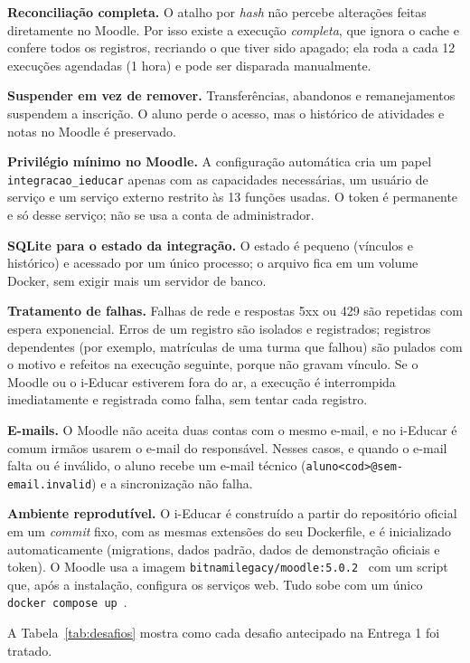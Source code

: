 \documentclass[12pt]{article}
\newcommand{\cod}[1]{\texttt{#1}}
\begin{document}
\textbf{Reconciliação completa.} O atalho por \emph{hash} não percebe
alterações feitas diretamente no Moodle. Por isso existe a execução
\emph{completa}, que ignora o cache e confere todos os registros, recriando o
que tiver sido apagado; ela roda a cada 12 execuções agendadas (1 hora) e pode
ser disparada manualmente.

\textbf{Suspender em vez de remover.} Transferências, abandonos e
remanejamentos suspendem a inscrição. O aluno perde o acesso, mas o histórico
de atividades e notas no Moodle é preservado.

\textbf{Privilégio mínimo no Moodle.} A configuração automática cria um papel
\cod{integracao\_ieducar} apenas com as capacidades necessárias, um usuário de
serviço e um serviço externo restrito às 13 funções usadas. O token é
permanente e só desse serviço; não se usa a conta de administrador.

\textbf{SQLite para o estado da integração.} O estado é pequeno (vínculos e
histórico) e acessado por um único processo; o arquivo fica em um volume
Docker, sem exigir mais um servidor de banco.

\textbf{Tratamento de falhas.} Falhas de rede e respostas 5xx ou 429 são
repetidas com espera exponencial. Erros de um registro são isolados e
registrados; registros dependentes (por exemplo, matrículas de uma turma que
falhou) são pulados com o motivo e refeitos na execução seguinte, porque não
gravam vínculo. Se o Moodle ou o i-Educar estiverem fora do ar, a execução é
interrompida imediatamente e registrada como falha, sem tentar cada registro.

\textbf{E-mails.} O Moodle não aceita duas contas com o mesmo e-mail, e no
i-Educar é comum irmãos usarem o e-mail do responsável. Nesses casos, e
quando o e-mail falta ou é inválido, o aluno recebe um e-mail técnico
(\cod{aluno<cod>@sem-email.invalid}) e a sincronização não falha.

\textbf{Ambiente reprodutível.} O i-Educar é construído a partir do
repositório oficial em um \emph{commit} fixo, com as mesmas extensões do seu
Dockerfile, e é inicializado automaticamente (migrations, dados padrão,
dados de demonstração oficiais e token). O Moodle usa a imagem
\cod{bitnamilegacy/moodle:5.0.2}~\cite{bitnamimoodle} com um script que,
após a instalação, configura os serviços web. Tudo sobe com um único
\cod{docker compose up}~\cite{compose}.

A Tabela~\ref{tab:desafios} mostra como cada desafio antecipado na Entrega 1
foi tratado.
\end{document}
